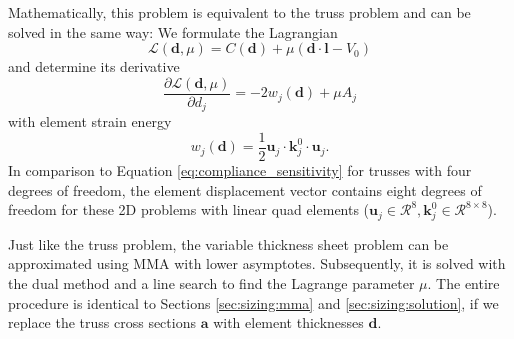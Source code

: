 Mathematically, this problem is equivalent to the truss problem and can be solved in the same way: We formulate the Lagrangian
\begin{equation}
    \mathcal{L}(\mathbf{d}, \mu) = C(\mathbf{d}) + \mu \left( \mathbf{d} \cdot \mathbf{l} - V_0 \right) 
\end{equation}
and determine its derivative
\begin{equation}
    \frac{\partial \mathcal{L} (\mathbf{d}, \mu)}{\partial d_j} 
    = - 2 w_j (\mathbf{d}) + \mu A_j
\end{equation}
with element strain energy 
\begin{equation}
    w_j(\mathbf{d}) = \frac{1}{2}\mathbf{u}_j  \cdot \mathbf{k}^0_j \cdot \mathbf{u}_j.
\end{equation}
In comparison to Equation \eqref{eq:compliance_sensitivity} for trusses with four degrees of freedom, the element displacement vector contains eight degrees of freedom for these 2D problems with linear quad elements ($\mathbf{u}_j \in \mathcal{R}^8, \mathbf{k}^0_j \in \mathcal{R}^{8\times 8}$). 

Just like the truss problem, the variable thickness sheet problem can be approximated using MMA with lower asymptotes. Subsequently, it is solved with the dual method and a line search to find the Lagrange parameter $\mu$. The entire procedure is identical to Sections \ref{sec:sizing:mma} and \ref{sec:sizing:solution}, if we replace the truss cross sections $\mathbf{a}$ with element thicknesses $\mathbf{d}$.

